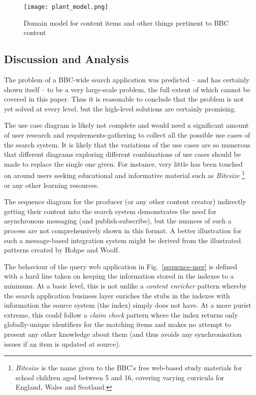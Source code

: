 \documentclass{llncs}
\begin{document}
\begin{figure}
  \begin{center}
    \texttt{[image: plant\_model.png]}
  \end{center}
  \caption{Domain model for content items and other things pertinent to BBC content\label{model}}
\end{figure}

\subsection{Discussion and Analysis}
\label{appraisal}

The problem of
a BBC-wide search application was predicted --
and has certainly shown itself -- to be a very large-scale problem, the
full extent of which cannot be covered in this paper. Thus it
is reasonable to conclude that the problem is not yet solved
at every level, but the high-level solutions are certainly promising.

The use case diagram is likely not complete and would need
a significant amount of user research and requirements-gathering
to collect all the possible use cases of the search system. It
is likely that the variations of the use cases are so numerous
that different diagrams exploring different combinations of use
cases should be made to replace the single one given. For instance,
very little has been touched on around users seeking educational
and informative material such as \emph{Bitesize}
\footnote{\emph{Bitesize} is the name given to the BBC's free web-based
study materials for school children aged between
5 and 16, covering varying curricula for England, Wales and Scotland.}
or any other learning resources.

The sequence diagram for the producer (or any other content creator)
indirectly getting their content into the search system demonstrates
the need for asynchronous messaging (and publish-subscribe), but
the nuances of such a process are not comprehensively shown in
this format. A better illustration for such a message-based integration
system might be derived from the illustrated patterns created
by Hohpe and Woolf\cite{hohpe2004enterprise}.

The behaviour of the query web application in Fig.~\ref{sequence-user}
is defined with a hard line
taken on keeping the information stored in the indexes to a minimum.
At a basic level, this is not unlike a \emph{content enricher} pattern
\cite{hohpe2004enterprise} whereby the search application
business layer enriches the stubs in the indexes with information
the source system (the index) simply does not have. At a more purist
extreme, this could follow a \emph{claim check} pattern where
the index returns only globally-unique identifiers for the matching
items and makes no attempt to present any other knowledge about them
(and thus avoids any synchronisation issues if an item is updated at
source).
\end{document}
